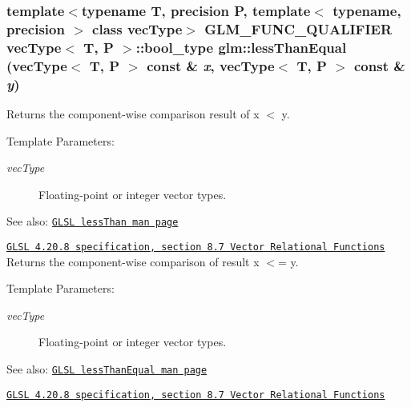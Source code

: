 \hypertarget{group__core__func__vector__relational_g9792ee46fa6f48a7f750984128c24d03}{
\subsubsection[lessThanEqual]{\setlength{\rightskip}{0pt plus 5cm}template$<$typename T, precision P, template$<$ typename, precision $>$ class vecType$>$ GLM\_\-FUNC\_\-QUALIFIER vecType$<$ T, P $>$::bool\_\-type glm::lessThanEqual (vecType$<$ T, P $>$ const \& {\em x}, \/  vecType$<$ T, P $>$ const \& {\em y})}}
\label{group__core__func__vector__relational_g9792ee46fa6f48a7f750984128c24d03}


Returns the component-wise comparison result of x $<$ y.

\begin{Desc}
\item[Template Parameters:]
\begin{description}
\item[{\em vecType}]Floating-point or integer vector types.\end{description}
\end{Desc}
\begin{Desc}
\item[See also:]\href{http://www.opengl.org/sdk/docs/manglsl/xhtml/lessThan.xml}{\tt GLSL lessThan man page} 

\href{http://www.opengl.org/registry/doc/GLSLangSpec.4.20.8.pdf}{\tt GLSL 4.20.8 specification, section 8.7 Vector Relational Functions} Returns the component-wise comparison of result x $<$= y.\end{Desc}
\begin{Desc}
\item[Template Parameters:]
\begin{description}
\item[{\em vecType}]Floating-point or integer vector types.\end{description}
\end{Desc}
\begin{Desc}
\item[See also:]\href{http://www.opengl.org/sdk/docs/manglsl/xhtml/lessThanEqual.xml}{\tt GLSL lessThanEqual man page} 

\href{http://www.opengl.org/registry/doc/GLSLangSpec.4.20.8.pdf}{\tt GLSL 4.20.8 specification, section 8.7 Vector Relational Functions} \end{Desc}


